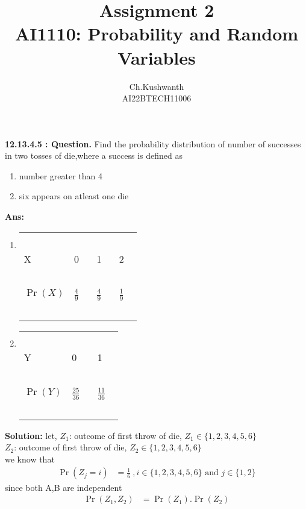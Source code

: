 \documentclass[journal,12pt,onecolumn]{IEEEtran}
\title{\textbf{Assignment 2}
\\ \textbf{AI1110:} Probability and Random Variables}
\author{Ch.Kushwanth
\\ AI22BTECH11006}
\providecommand{\pr}[1]{\ensuremath{\Pr\left(#1\right)}}
\theoremstyle{remark}
\begin{document}
\maketitle
\textbf{12.13.4.5 : Question.}
Find the probability \mbox{distribution} of number of successes in two tosses of die,where a success is defined as
\begin{enumerate}
\item number greater than 4
\item six appears on atleast one die
\end{enumerate}
\textbf{Ans:}
\begin{enumerate}
\item 
\begin{tabular}{|l|l|l|l|}
\hline 
\ & \ & \ & \\
\Large X & \Large 0 \  & \Large 1 \  & \Large 2 \ \\
\hline 
\ & \ & \ & \\
 \Large $\pr{X}$ &  \Large $\frac{4}{9}$ \  &  \Large $\frac{4}{9}$ \  &\Large $\frac{1}{9}$ \ \\
 \ & \ & \ & \\
\hline
\end{tabular}
\item
\begin{tabular}{|l|l|l|}
\hline 
\ & \ & \ \\
\Large Y & \Large 0 \  & \Large 1 \ \\
\hline 
\ & \ & \ \\
 \Large $\pr{Y}$ &  \Large $\frac{25}{36}$ \  &  \Large $\frac{11}{36}$ \  \\
 \ & \ & \ \\
\hline
\end{tabular}
\end{enumerate}
 \textbf{Solution:}
let, $Z_1$: outcome of first throw of die, \mbox{$Z_1\in \{1,2,3,4,5,6\}$}\\
$Z_2$: outcome of first throw of die, \mbox{$Z_2\in \{1,2,3,4,5,6\}$}\\
we know that
\begin{align}
\pr{Z_j=i}&=\frac{1}{6}\ , i\in \{1,2,3,4,5,6\} \text{ and } j\in \{1,2\}  \label{eq:v}
\end{align}
since both A,B are independent
\begin{align}
\pr{Z_1,Z_2}&=\pr{Z_1}.\pr{Z_2} \label{eq:t}
\end{align}
\end{document}
